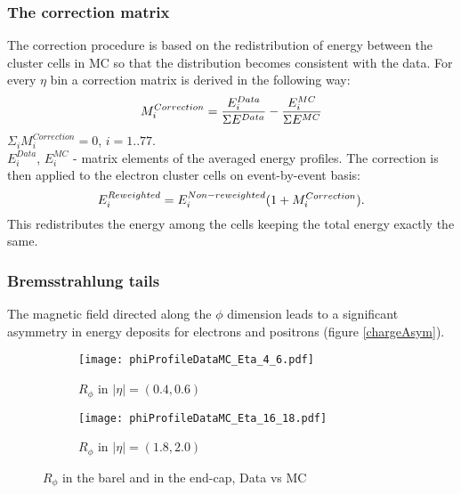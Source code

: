  \subsubsection{The correction matrix}
  The correction procedure is based on the redistribution of energy between the cluster cells in MC so that the distribution becomes consistent with the data. For every $\eta$ bin a correction matrix is derived in the following way:
  \begin{equation}
  \nonumber
  \large {M_{i}^{Correction} = \frac{E_{i}^{Data}}{\Sigma E^{Data}} - \frac{E_{i}^{MC}}{\Sigma E^{MC}}}
  \end{equation}
  $\Sigma_i M_i^{Correction} = 0$, $i = 1..77$.\\
  $E_i^{Data}$, $E_i^{MC}$ - matrix elements of the averaged energy profiles. 
  The correction is then applied to the electron cluster cells on event-by-event basis:
  \begin{equation}
  \nonumber
  \large {E_{i}^{Reweighted} = {E_{i}^{Non-reweighted}(1+M_{i}^{Correction}).}}
  \end{equation}
  This redistributes the energy among the cells keeping the total energy exactly the same.
  \subsubsection{Bremsstrahlung tails}
  The magnetic field directed along the $\phi$ dimension leads to a significant asymmetry in energy deposits for electrons and positrons (figure \ref{chargeAsym}). 
  
  
      \begin{figure}[htbp]
  	\begin{subfigure}[t]{0.5\textwidth}
  		\texttt{[image: phiProfileDataMC\_Eta\_4\_6.pdf]}
  		\caption{$R_{\phi}$ in $|\eta| = (0.4,0.6)$ }
  		\label{fig::rphi_norew_04}
  	\end{subfigure}
  	\hfill
  	\begin{subfigure}[t]{0.5\textwidth} 
  		\texttt{[image: phiProfileDataMC\_Eta\_16\_18.pdf]}
  		\caption{$R_{\phi}$ in $|\eta| = (1.8,2.0)$ }
  		\label{fig::rphi_norew_18}
  	\end{subfigure}
  	\caption{$R_{\phi}$ in the barel and in the end-cap, Data vs MC}
  	\label{fig::rphi_norew}
  \end{figure}


